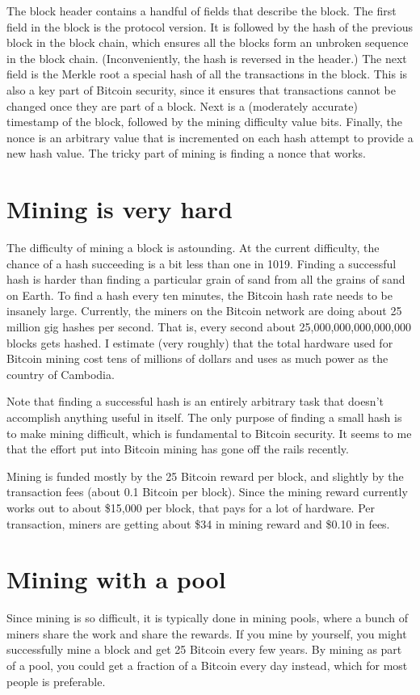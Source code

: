 The block header contains a handful of fields that describe the block. The first field in the block is the protocol version. It is followed by the hash of the previous block in the block chain, which ensures all the blocks form an unbroken sequence in the block chain. (Inconveniently, the hash is reversed in the header.) The next field is the Merkle root a special hash of all the transactions in the block. This is also a key part of Bitcoin security, since it ensures that transactions cannot be changed once they are part of a block. Next is a (moderately accurate) timestamp of the block, followed by the mining difficulty value bits.  Finally, the nonce is an arbitrary value that is incremented on each hash attempt to provide a new hash value. The tricky part of mining is finding a nonce that works.

\section{Mining is very hard}
The difficulty of mining a block is astounding. At the current difficulty, the chance of a hash succeeding is a bit less than one in 1019. Finding a successful hash is harder than finding a particular grain of sand from all the grains of sand on Earth. To find a hash every ten minutes, the Bitcoin hash rate needs to be insanely large. Currently, the miners on the Bitcoin network are doing about 25 million gig hashes per second\cite{bergstra2014bitcoin}. That is, every second about 25,000,000,000,000,000 blocks gets hashed. I estimate (very roughly) that the total hardware used for Bitcoin mining cost tens of millions of dollars and uses as much power as the country of Cambodia.

Note that finding a successful hash is an entirely arbitrary task that doesn't accomplish anything useful in itself. The only purpose of finding a small hash is to make mining difficult, which is fundamental to Bitcoin security. It seems to me that the effort put into Bitcoin mining has gone off the rails recently.

Mining is funded mostly by the 25 Bitcoin reward per block, and slightly by the transaction fees (about 0.1 Bitcoin per block). Since the mining reward currently works out to about \$15,000 per block, that pays for a lot of hardware. Per transaction, miners are getting about \$34 in mining reward and \$0.10 in fees.

\section{Mining with a pool}
Since mining is so difficult, it is typically done in mining pools, where a bunch of miners share the work and share the rewards. If you mine by yourself, you might successfully mine a block and get 25 Bitcoin every few years. By mining as part of a pool, you could get a fraction of a Bitcoin every day instead, which for most people is preferable\cite{bergstra2014bitcoin}.

